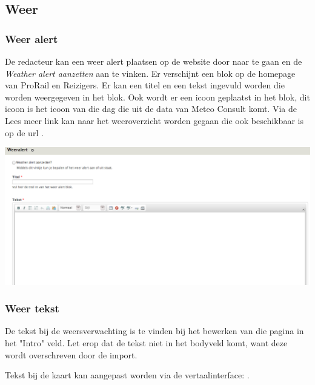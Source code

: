 \subsection{Weer}

\subsubsection{Weer alert}
De redacteur kan een weer alert plaatsen op de website door naar  te gaan en de \emph{Weather alert aanzetten} aan te vinken. Er verschijnt een blok op de homepage van ProRail en Reizigers. Er kan een titel en een tekst ingevuld worden die worden weergegeven in het blok. Ook wordt er een icoon geplaatst in het blok, dit icoon is het icoon van die dag die uit de data van Meteo Consult komt. Via de Lees meer link kan naar het weeroverzicht worden gegaan die ook beschikbaar is op de url .

\begin{center}
\includegraphics[width=\textwidth]{img/weeralert.png}
\end{center}

\subsubsection{Weer tekst}
De tekst bij de weersverwachting is te vinden bij het bewerken van die pagina in het "Intro" veld. Let erop dat de tekst niet in het bodyveld komt, want deze wordt overschreven door de import.

Tekst bij de kaart kan aangepast worden via de vertaalinterface: .